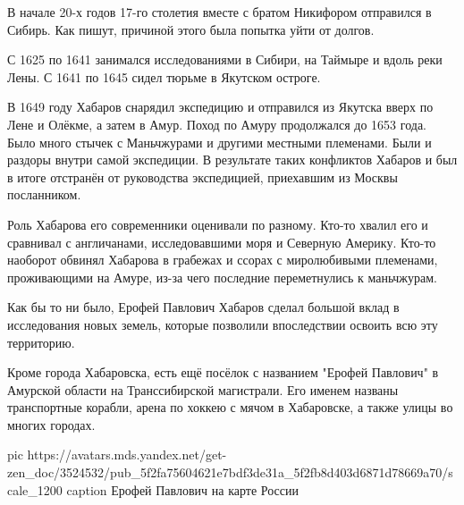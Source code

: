 В начале 20-х годов 17-го столетия вместе с братом Никифором отправился в
Сибирь. Как пишут, причиной этого была попытка уйти от долгов.

С 1625 по 1641 занимался исследованиями в Сибири, на Таймыре и вдоль реки Лены.
С 1641 по 1645 сидел тюрьме в Якутском остроге.

В 1649 году Хабаров снарядил экспедицию и отправился из Якутска вверх по Лене и
Олёкме, а затем в Амур. Поход по Амуру продолжался до 1653 года. Было много
стычек с Маньчжурами и другими местными племенами. Были и раздоры внутри самой
экспедиции. В результате таких конфликтов Хабаров и был в итоге отстранён от
руководства экспедицией, приехавшим из Москвы посланником.

Роль Хабарова его современники оценивали по разному. Кто-то хвалил его и
сравнивал с англичанами, исследовавшими моря и Северную Америку. Кто-то
наоборот обвинял Хабарова в грабежах и ссорах с миролюбивыми племенами,
проживающими на Амуре, из-за чего последние переметнулись к маньчжурам.

Как бы то ни было, Ерофей Павлович Хабаров сделал большой вклад в исследования
новых земель, которые позволили впоследствии освоить всю эту территорию.

Кроме города Хабаровска, есть ещё посёлок с названием "Ерофей Павлович" в
Амурской области на Транссибирской магистрали. Его именем названы транспортные
корабли, арена по хоккею с мячом в Хабаровске, а также улицы во многих городах.


\ifcmt
  pic https://avatars.mds.yandex.net/get-zen_doc/3524532/pub_5f2fa75604621e7bdf3de31a_5f2fb8d403d6871d78669a70/scale_1200
	caption Ерофей Павлович на карте России
\fi

